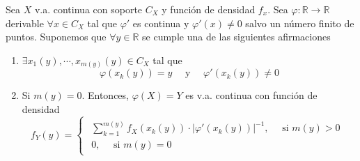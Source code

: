\begin{theo}
  Sea $X$ v.a. continua con soporte $C_{X}$ y función de densidad $f_{x}$. Sea $ \varphi : \mathbb{R} \to \mathbb{R}$ derivable $\forall x \in C_{X}$ tal que $\varphi'$ es continua y $\varphi'(x) \neq 0$ salvo un número finito de puntos. Suponemos que $\forall y \in \mathbb{R}$ se cumple una de las siguientes afirmaciones
  \begin{enumerate}[label=(\roman*)]
    \item $\exists x_{1}(y), \cdots, x_{m(y)}(y) \in C_{X}$ tal que
      \[
        \varphi(x_{k}(y)) = y \quad \text{ y } \quad \varphi'(x_{k}(y)) \neq 0
      \]
    \item Si $m(y) = 0$. Entonces, $\varphi(X) = Y$ es v.a. continua con función de densidad
      \[ 
        f_{Y}(y) =
        \begin{cases}
          \begin{aligned}
          \sum_{k = 1}^{m(y)} f_{X}(x_{k}(y)) \cdot | \varphi'(x_{k}(y)) |^{-1}, \quad \text{ si } m(y) > 0\\
          0, \quad \text{ si } m(y) = 0
          \end{aligned}
        \end{cases} 
      \] 
  \end{enumerate}
\end{theo}
